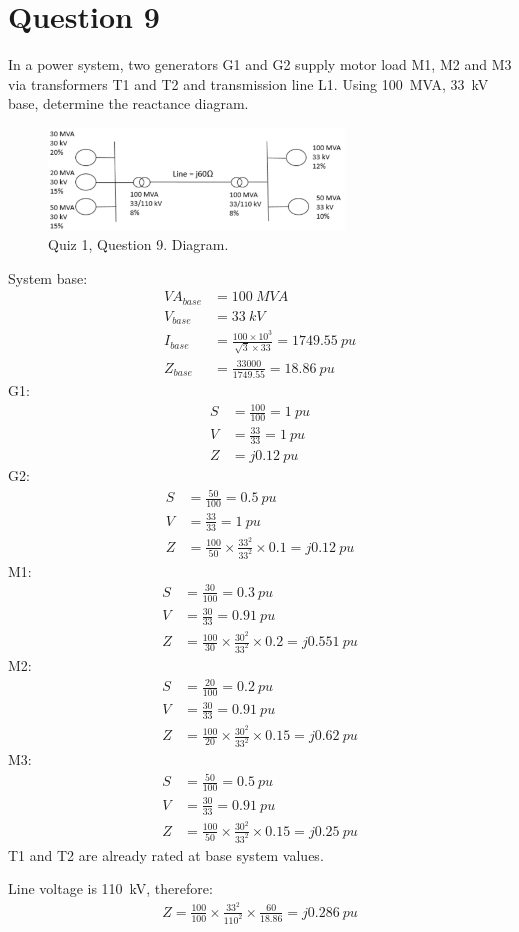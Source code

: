 \section{Question 9}
In a power system, two generators G1 and G2 supply motor load M1, M2 and M3 via transformers T1 and T2 and transmission line L1. Using \SI{100}{MVA}, \SI{33}{kV} base, determine the reactance diagram. 
\begin{figure}[H]
    \centering
    \includegraphics[width = 0.7\textwidth]{img/figure149.png}
    \caption{Quiz 1, Question 9. Diagram.}
\end{figure}
System base:
\begin{align}
    VA_{base} &= \SI{100}{MVA}\\
    V_{base} &= \SI{33}{kV}\\
    I_{base} &= \frac{100\times 10^3}{\sqrt{3}\times 33} = \SI{1749.55}{pu}\\
    Z_{base} &= \frac{33000}{1749.55} = \SI{18.86}{pu}
\end{align}
G1:
\begin{align}
    S &= \frac{100}{100} = \SI{1}{pu}\\
    V &= \frac{33}{33} = \SI{1}{pu}\\
    Z &= j\SI{0.12}{pu}
\end{align}
G2:
\begin{align}
    S &= \frac{50}{100} = \SI{0.5}{pu}\\
    V &= \frac{33}{33} = \SI{1}{pu}\\
    Z &= \frac{100}{50}\times \frac{33^2}{33^2}\times 0.1 = j\SI{0.12}{pu}
\end{align}
M1:
\begin{align}
    S &= \frac{30}{100} = \SI{0.3}{pu}\\
    V &= \frac{30}{33} = \SI{0.91}{pu}\\
    Z &= \frac{100}{30}\times \frac{30^2}{33^2}\times 0.2 = j\SI{0.551}{pu}
\end{align}
M2:
\begin{align}
    S &= \frac{20}{100} = \SI{0.2}{pu}\\
    V &= \frac{30}{33} = \SI{0.91}{pu}\\
    Z &= \frac{100}{20}\times \frac{30^2}{33^2}\times 0.15 = j\SI{0.62}{pu}
\end{align}
M3:
\begin{align}
    S &= \frac{50}{100} = \SI{0.5}{pu}\\
    V &= \frac{30}{33} = \SI{0.91}{pu}\\
    Z &= \frac{100}{50}\times \frac{30^2}{33^2}\times 0.15 = j\SI{0.25}{pu}
\end{align}
T1 and T2 are already rated at base system values.

Line voltage is \SI{110}{kV}, therefore:
\begin{gather}
    Z = \frac{100}{100}\times \frac{33^2}{110^2}\times \frac{60}{18.86} = j\SI{0.286}{pu}
\end{gather}